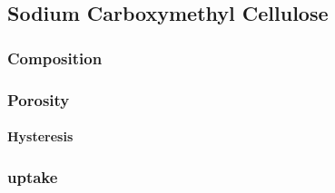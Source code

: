 \subsection{Sodium Carboxymethyl Cellulose}
\label{ss:nc}

\subsubsection{Composition}

\subsubsection{Porosity}

\paragraph{Hysteresis}

\subsubsection{ uptake}